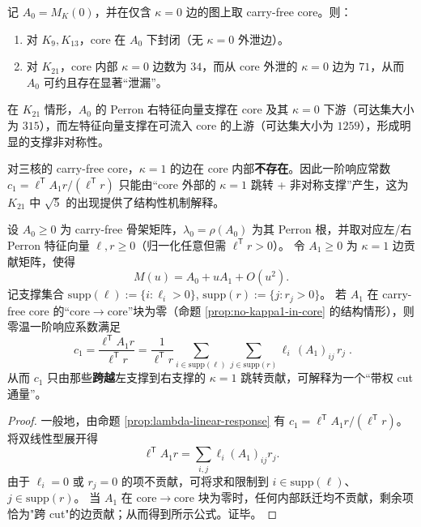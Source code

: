 \begin{proposition}\label{prop:carry-free-leakage}
记 $A_0=M_K(0)$，并在仅含 $\kappa=0$ 边的图上取 carry-free core。则：
\begin{enumerate}
  \item 对 $K_9,K_{13}$，core 在 $A_0$ 下封闭（无 $\kappa=0$ 外泄边）。
  \item 对 $K_{21}$，core 内部 $\kappa=0$ 边数为 $34$，而从 core 外泄的 $\kappa=0$ 边为 $71$，从而 $A_0$ 可约且存在显著“泄漏”。
\end{enumerate}
在 $K_{21}$ 情形，$A_0$ 的 Perron 右特征向量支撑在 core 及其 $\kappa=0$ 下游（可达集大小为 $315$），而左特征向量支撑在可流入 core 的上游（可达集大小为 $1259$），形成明显的支撑非对称性。
\end{proposition}

\begin{proposition}\label{prop:no-kappa1-in-core}
对三核的 carry-free core，$\kappa=1$ 的边在 core 内部\textbf{不存在}。因此一阶响应常数
\(
c_1=\ell^{\mathsf T}A_1r/(\ell^{\mathsf T}r)
\)
只能由“core 外部的 $\kappa=1$ 跳转 + 非对称支撑”产生，这为 $K_{21}$ 中 $\sqrt5$ 的出现提供了结构性机制解释。
\end{proposition}

\begin{proposition}[支撑剪切（cut-flux）公式：\texorpdfstring{$\kappa=1$}{kappa=1} 不在 core 内部时的一阶通量]\label{prop:c1-cut-flux}
设 \(A_0\ge 0\) 为 carry-free 骨架矩阵，\(\lambda_0=\rho(A_0)\) 为其 Perron 根，并取对应左/右 Perron 特征向量 \(\ell,r\ge 0\)（归一化任意但需 \(\ell^{\mathsf T}r>0\)）。
令 \(A_1\ge 0\) 为 \(\kappa=1\) 边贡献矩阵，使得
\[
M(u)=A_0+uA_1+O(u^2).
\]
记支撑集合
\(
\mathrm{supp}(\ell):=\{i:\ell_i>0\}
\),
\(
\mathrm{supp}(r):=\{j:r_j>0\}
\)。
若 \(A_1\) 在 carry-free core 的“core\(\to\)core”块为零（命题 \ref{prop:no-kappa1-in-core} 的结构情形），则零温一阶响应系数满足
\[
\boxed{\;
c_1=\frac{\ell^{\mathsf T}A_1r}{\ell^{\mathsf T}r}
=\frac{1}{\ell^{\mathsf T}r}\sum_{i\in\mathrm{supp}(\ell)}\sum_{j\in\mathrm{supp}(r)}\ell_i\,(A_1)_{ij}\,r_j\; }.
\]
从而 \(c_1\) 只由那些\textbf{跨越}左支撑到右支撑的 \(\kappa=1\) 跳转贡献，可解释为一个“带权 cut 通量”。
\end{proposition}
\begin{proof}
一般地，由命题 \ref{prop:lambda-linear-response} 有
\(
c_1=\ell^{\mathsf T}A_1r/(\ell^{\mathsf T}r)
\)。
将双线性型展开得
\[
\ell^{\mathsf T}A_1r=\sum_{i,j}\ell_i(A_1)_{ij}r_j.
\]
由于 \(\ell_i=0\) 或 \(r_j=0\) 的项不贡献，可将求和限制到 \(i\in\mathrm{supp}(\ell)\)、\(j\in\mathrm{supp}(r)\)。
当 \(A_1\) 在 core\(\to\)core 块为零时，任何内部跃迁均不贡献，剩余项恰为"跨 cut"的边贡献；从而得到所示公式。证毕。
\end{proof}



